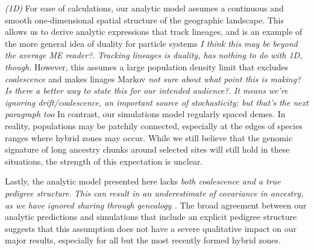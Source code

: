 \documentclass[11pt,letterpaper]{article}
\newcommand{\alisa}[1]{{\em \color{red} #1}}
\newcommand{\plr}[1]{{\em \color{blue} #1}}
\newcommand{\yb}[1]{{\em \color{magenta} #1}}
\begin{document}




\plr{(1D)}
For ease of calculations, our analytic model assumes a continuous and smooth one-dimensional spatial structure of the geographic landscape. This allows us to derive analytic expressions that track lineages, and is an example of the more general idea of duality for particle systems \alisa{I think this may be beyond the average ME reader?}. 
\plr{Tracking lineages is duality, has nothing to do with 1D, though.}
However, this assumes a large population density limit that excludes \plr{coalescence} and makes linages Markov \alisa{not sure about what point this is making? Is there a better way to state this for our intended audience?}.  
\plr{It means we're ignoring drift/coalescence, an important source of stochasticity; but that's the next paragraph too}
In contrast, our simulations model regularly spaced demes. In reality, populations may be patchily connected, especially at the edges of species ranges where hybrid zones may occur. While we still believe that the genomic signature of long ancestry chunks around selected sites will still hold in these situations, the strength of this expectation is unclear.

Lastly, the analytic model presented here lacks \yb{both coalescence and a true pedigree structure}. \alisa{This can result in an underestimate of covariance in ancestry, as we have ignored sharing through genealogy \cite{Liang2014}.} 
The broad agreement between our analytic predictions and simulations that include an explicit pedigree structure suggests that this assumption does not have a severe qualitative impact on our major results, especially for all but the most recently formed hybrid zones.
\end{document}
